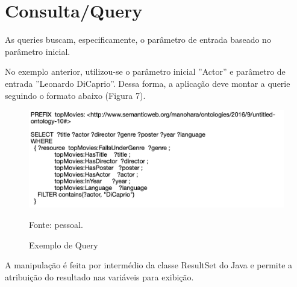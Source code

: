 \section{Consulta/Query}

 As queries buscam, especificamente, o parâmetro de entrada baseado no parâmetro inicial.
 
 No exemplo anterior, utilizou-se o parâmetro inicial ''Actor'' e parâmetro de entrada ''Leonardo DiCaprio''. Dessa forma, a aplicação deve montar a querie seguindo o formato abaixo (Figura 7).

\begin{figure}[H]
	\centering
	\includegraphics[width=0.8\linewidth]{images/Query}
	\caption{Exemplo de Query}
	Fonte: pessoal.
	\label{fig:Exemplo de Query}
\end{figure}

A manipulação é feita por intermédio da classe ResultSet do Java e permite a atribuição do resultado nas variáveis para exibição.